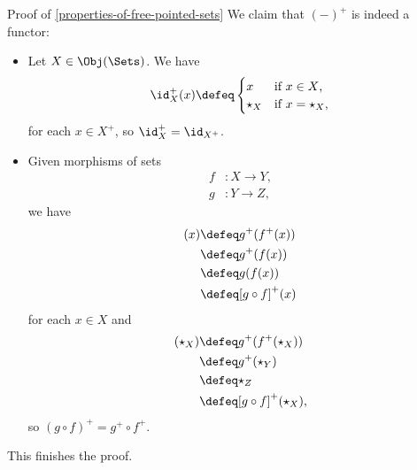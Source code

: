 \begin{Proof}{Proof of \cref{properties-of-free-pointed-sets}}%
    We claim that $(-)^{+}$ is indeed a functor:
    \begin{itemize}
        \item{}Let $X\in\Obj(\Sets)$. We have
            \[
                \id^{+}_{X}(x)%
                \defeq%
                \begin{cases}
                    x         &\text{if $x\in X$,}\\
                    \star_{X} &\text{if $x=\star_{X}$,}
                \end{cases}
            \]%
            for each $x\in X^{+}$, so $\id^{+}_{X}=\id_{X^{+}}$.
        \item{}Given morphisms of sets
            \begin{align*}
                f &\colon X \to Y,\\
                g &\colon Y \to Z,
            \end{align*}
            we have
            \begin{align*}
                [g^{+}\circ f^{+}](x) &\defeq g^{+}(f^{+}(x))\\
                                      &\defeq g^{+}(f(x))\\
                                      &\defeq g(f(x))\\
                                      &\defeq [g\circ f]^{+}(x)%
            \end{align*}
            for each $x\in X$ and
            \begin{align*}
                [g^{+}\circ f^{+}](\star_{X}) &\defeq g^{+}(f^{+}(\star_{X}))\\
                                              &\defeq g^{+}(\star_{Y})\\
                                              &\defeq \star_{Z}\\
                                              &\defeq [g\circ f]^{+}(\star_{X}),
            \end{align*}
            so $(g\circ f)^{+}=g^{+}\circ f^{+}$.
    \end{itemize}
    This finishes the proof.


\end{Proof}
